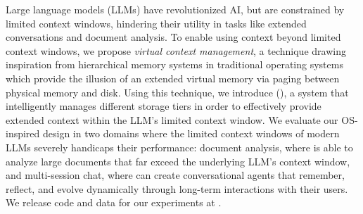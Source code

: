 Large language models (LLMs) have revolutionized AI, but are constrained by limited context windows, hindering their utility in tasks like extended conversations and document analysis. To enable using context beyond limited context windows, we propose \textit{virtual context management}, a technique drawing inspiration from hierarchical memory systems in traditional operating systems which provide the illusion of an extended virtual memory via paging between physical memory and disk. 
Using this technique, we introduce \ours (\ourslong), a system that intelligently manages different storage tiers in order to effectively provide extended context within the LLM's limited context window.
We evaluate our OS-inspired design in two domains where the limited context windows of modern LLMs severely handicaps their performance: document analysis, where \ours is able to analyze large documents that far exceed the underlying LLM's context window, and multi-session chat, where \ours can create conversational agents that remember, reflect, and evolve dynamically through long-term interactions with their users. 
We release \ours code and data for our experiments at \website.
